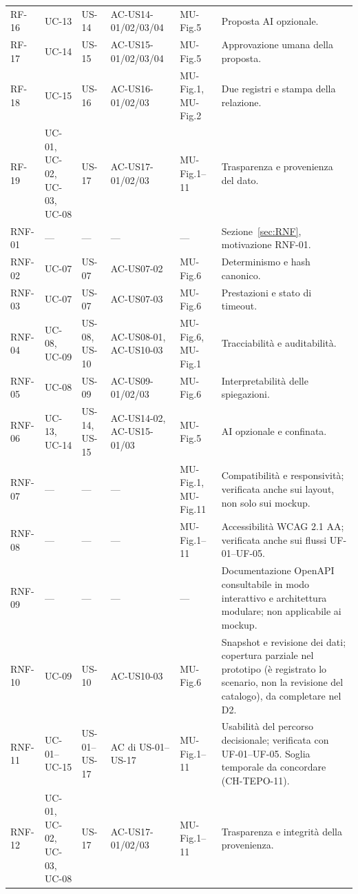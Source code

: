 \begin{longtable}{L{1.55cm} L{1.5cm} L{1.4cm} L{3.0cm} L{1.9cm} L{4.6cm}}
RF-16 & UC-13 & US-14 & AC-US14-01/02/03/04 & MU-Fig.5 & Proposta AI opzionale. \\
RF-17 & UC-14 & US-15 & AC-US15-01/02/03/04 & MU-Fig.5 & Approvazione umana della proposta. \\
RF-18 & UC-15 & US-16 & AC-US16-01/02/03 & MU-Fig.1, MU-Fig.2 & Due registri e stampa della relazione. \\
RF-19 & UC-01, UC-02, UC-03, UC-08 & US-17 & AC-US17-01/02/03 & MU-Fig.1--11 & Trasparenza e provenienza del dato. \\
\midrule
RNF-01 & --- & --- & --- & --- & Sezione~\ref{sec:RNF}, motivazione RNF-01. \\
RNF-02 & UC-07 & US-07 & AC-US07-02 & MU-Fig.6 & Determinismo e hash canonico. \\
RNF-03 & UC-07 & US-07 & AC-US07-03 & MU-Fig.6 & Prestazioni e stato di timeout. \\
RNF-04 & UC-08, UC-09 & US-08, US-10 & AC-US08-01, AC-US10-03 & MU-Fig.6, MU-Fig.1 & Tracciabilità e auditabilità. \\
RNF-05 & UC-08 & US-09 & AC-US09-01/02/03 & MU-Fig.6 & Interpretabilità delle spiegazioni. \\
RNF-06 & UC-13, UC-14 & US-14, US-15 & AC-US14-02, AC-US15-01/03 & MU-Fig.5 & AI opzionale e confinata. \\
RNF-07 & --- & --- & --- & MU-Fig.1, MU-Fig.11 & Compatibilità e responsività; verificata anche sui layout, non solo sui mockup. \\
RNF-08 & --- & --- & --- & MU-Fig.1--11 & Accessibilità WCAG 2.1 AA; verificata anche sui flussi UF-01--UF-05. \\
RNF-09 & --- & --- & --- & --- & Documentazione OpenAPI consultabile in modo interattivo e architettura modulare; non applicabile ai mockup. \\
RNF-10 & UC-09 & US-10 & AC-US10-03 & MU-Fig.6 & Snapshot e revisione dei dati; copertura parziale nel prototipo (è registrato lo scenario, non la revisione del catalogo), da completare nel D2. \\
RNF-11 & UC-01--UC-15 & US-01--US-17 & AC di US-01--US-17 & MU-Fig.1--11 & Usabilità del percorso decisionale; verificata con UF-01--UF-05. Soglia temporale da concordare (CH-TEPO-11). \\
RNF-12 & UC-01, UC-02, UC-03, UC-08 & US-17 & AC-US17-01/02/03 & MU-Fig.1--11 & Trasparenza e integrità della provenienza. \\
\end{longtable}
\endgroup

